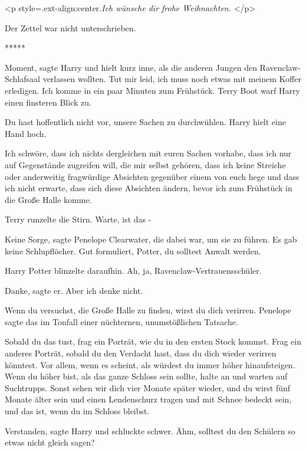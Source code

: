 <p style=\grqq{}.ext-align:center\grqq{}.\emph{Ich wünsche dir frohe
Weihnachten. }</p>

Der Zettel war nicht unterschrieben.

\begin{center}*****\end{center}

\glqq Moment\grqq{}, sagte Harry und hielt kurz inne, als die anderen Jungen
den Ravenclaw-Schlafsaal verlassen wollten. \glqq Tut mir leid, ich muss noch
etwas mit meinem Koffer erledigen. Ich komme in ein paar Minuten zum
Frühstück.\grqq{} Terry Boot warf Harry einen finsteren Blick zu.

\glqq Du hast hoffentlich nicht vor, unsere Sachen zu durchwühlen.\grqq{} Harry
hielt eine Hand hoch.

\glqq Ich schwöre, dass ich nichts dergleichen mit euren Sachen vorhabe, dass
ich nur auf Gegenstände zugreifen will, die mir selbst gehören, dass ich keine
Streiche oder anderweitig fragwürdige Absichten gegenüber einem von euch hege
und dass ich nicht erwarte, dass sich diese Absichten ändern, bevor ich zum
Frühstück in die Große Halle komme.\grqq{}

Terry runzelte die Stirn. \glqq Warte, ist das -\grqq{}

\glqq Keine Sorge\grqq{}, sagte Penelope Clearwater, die dabei war, um sie zu
führen. \glqq Es gab keine Schlupflöcher. Gut formuliert, Potter, du solltest
Anwalt werden.\grqq{}

Harry Potter blinzelte daraufhin. Ah, ja, Ravenclaw-Vertrauensschüler.

\glqq Danke\grqq{}, sagte er. \glqq Aber ich denke nicht.\grqq{}

\glqq Wenn du versuchst, die Große Halle zu finden, wirst du dich
verirren.\grqq{} Penelope sagte das im Tonfall einer nüchternen, unumstößlichen
Tatsache.

\glqq Sobald du das tust, frag ein Porträt, wie du in den ersten Stock kommst.
Frag ein anderes Porträt, sobald du den Verdacht hast, dass du dich wieder
verirren könntest. Vor allem, wenn es scheint, als würdest du immer höher
hinaufsteigen. Wenn du höher bist, als das ganze Schloss sein sollte, halte an
und warten auf Suchtrupps. Sonst sehen wir dich vier Monate später wieder, und
du wirst fünf Monate älter sein und einen Lendenschurz tragen und mit Schnee
bedeckt sein, und das ist, wenn du im Schloss bleibst.\grqq{}

\glqq Verstanden\grqq{}, sagte Harry und schluckte schwer. \glqq Ähm, solltest
du den Schülern so etwas nicht gleich sagen?\grqq{}

